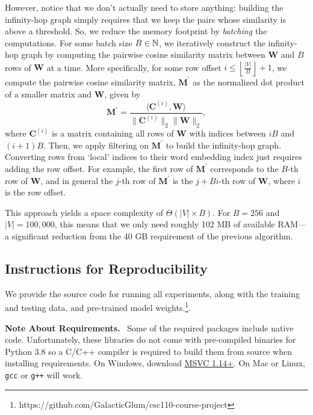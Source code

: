 \documentclass{paper}
\newcommand{\mat}[1]{\bm{#1}}
\newcommand{\inlineSection}[1]{\vspace{0.5em}\noindent\textbf{#1.}~}
\begin{document}
However, notice that we don't actually need to store anything: building the infinity-hop graph simply requires that we keep the pairs whose similarity is above a threshold. So, we reduce the memory footprint by \textit{batching} the computations. For some batch size $B\in\mathbb{N}$, we iteratively construct the infinity-hop graph by computing the pairwise cosine similarity matrix between $\mat{W}$ and $B$ rows of $\mat{W}$ at a time. More specifically, for some row offset $i\leq \left\lfloor\frac{|V|}{B}\right\rfloor + 1$, we compute the pairwise cosine similarity matrix, $\mat{M}^\prime$ as the normalized dot product of a smaller matrix and $\mat{W}$, given by
\begin{equation*}
    \mat{M}^\prime=\frac{\langle\mat{C}^{(i)}, \mat{W}\rangle}{\|\mat{C}^{(i)}\|_2\|\mat{W}\|_2},
\end{equation*}
where $\mat{C}^{(i)}$ is a matrix containing all rows of $\mat{W}$ with indices between $iB$ and $(i+1)B$. Then, we apply filtering on $\mat{M}^\prime$ to build the infinity-hop graph. Converting rows from `local' indices to their word embedding index just requires adding the row offset. For example, the first row of $\mat{M}^\prime$ corresponds to the $B$-th row of $\mat{W}$, and in general the $j$-th row of $\mat{M}^\prime$ is the $j+Bi$-th row of $\mat{W}$, where $i$ is the row offset.

This approach yields a space complexity of $\Theta(|V|\times B)$. For $B=256$ and $|V|=100,000$, this means that we only need roughly 102 MB of available RAM---a significant reduction from the 40 GB requirement of the previous algorithm.

\subsection{Instructions for Reproducibility}
We provide the source code for running all experiments, along with the training and testing data, and pre-trained model weights.\footnote{https://github.com/GalacticGlum/csc110-course-project}.

\inlineSection{Note About Requirements} Some of the required packages include native code. Unfortunately, these libraries do not come with pre-compiled binaries for Python 3.8 so a C/C++ compiler is required to build them from source when installing requirements. On Windows, download \textcolor{blue}{\href{https://visualstudio.microsoft.com/downloads/\#build-tools-for-visual-studio-2019}{MSVC 1.14+}}. On Mac or Linux, \texttt{gcc} or \texttt{g++} will work.
\end{document}
